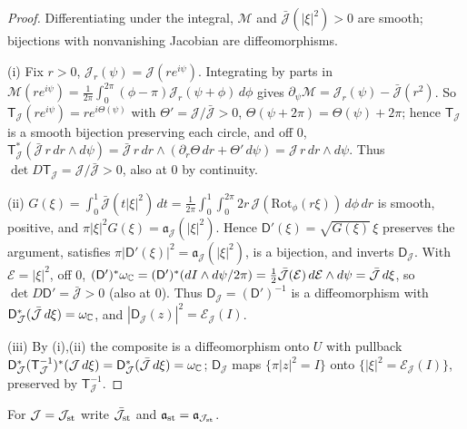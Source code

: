 \begin{proof}
Differentiating under the integral, $\mathcal M$ and $\bar{\mathcal J}(|\xi|^2)>0$ are smooth; bijections with nonvanishing Jacobian are diffeomorphisms.

(i) Fix $r>0$, $\mathcal J_r(\psi)=\mathcal J(re^{i\psi})$. Integrating by parts in $\mathcal M(re^{i\psi})=\frac1{2\pi}\int_0^{2\pi}(\phi-\pi)\mathcal J_r(\psi+\phi)\,d\phi$ gives $\partial_\psi\mathcal M=\mathcal J_r(\psi)-\bar{\mathcal J}(r^2)$. So $\mathsf T_{\mathcal J}(re^{i\psi})=re^{i\Theta(\psi)}$ with $\Theta'=\mathcal J/\bar{\mathcal J}>0$, $\Theta(\psi+2\pi)=\Theta(\psi)+2\pi$; hence $\mathsf T_{\mathcal J}$ is a smooth bijection preserving each circle, and off $0$, $\mathsf T_{\mathcal J}^*(\bar{\mathcal J}\,r\,dr\wedge d\psi)=\bar{\mathcal J}\,r\,dr\wedge(\partial_r\Theta\,dr+\Theta'\,d\psi)=\mathcal J\,r\,dr\wedge d\psi$. Thus $\det D\mathsf T_{\mathcal J}=\mathcal J/\bar{\mathcal J}>0$, also at $0$ by continuity.

(ii) $G(\xi)=\int_0^1\bar{\mathcal J}(t|\xi|^2)\,dt=\frac1{2\pi}\int_0^1\!\int_0^{2\pi}2r\,\mathcal J(\mathrm{Rot}_\phi(r\xi))\,d\phi\,dr$ is smooth, positive, and $\pi|\xi|^2G(\xi)=\mathfrak a_{\mathcal J}(|\xi|^2)$. Hence $\mathsf D'(\xi)=\sqrt{G(\xi)}\,\xi$ preserves the argument, satisfies $\pi|\mathsf D'(\xi)|^2=\mathfrak a_{\mathcal J}(|\xi|^2)$, is a bijection, and inverts $\mathsf D_{\mathcal J}$. With $\mathcal E=|\xi|^2$, off $0$, $(\mathsf D')^*\omega_{\mathbb{C}}=(\mathsf D')^*(dI\wedge d\psi/2\pi)=\tfrac12\bar{\mathcal J}(\mathcal E)\,d\mathcal E\wedge d\psi=\bar{\mathcal J}\,d\xi$, so $\det D\mathsf D'=\bar{\mathcal J}>0$ (also at $0$). Thus $\mathsf D_{\mathcal J}=(\mathsf D')^{-1}$ is a diffeomorphism with $\mathsf D_{\mathcal J}^*(\bar{\mathcal J}\,d\xi)=\omega_{\mathbb{C}}$, and $|\mathsf D_{\mathcal J}(z)|^2=\mathcal E_{\mathcal J}(I)$.

(iii) By (i),(ii) the composite is a diffeomorphism onto $U$ with pullback $\mathsf D_{\mathcal J}^*(\mathsf T_{\mathcal J}^{-1})^*(\mathcal J\,d\xi)=\mathsf D_{\mathcal J}^*(\bar{\mathcal J}\,d\xi)=\omega_{\mathbb{C}}$; $\mathsf D_{\mathcal J}$ maps $\{\pi|z|^2=I\}$ onto $\{|\xi|^2=\mathcal E_{\mathcal J}(I)\}$, preserved by $\mathsf T_{\mathcal J}^{-1}$.
\end{proof}

For $\mathcal J=\mathcal J_{\rm st}$ write $\bar{\mathcal J}_{\rm st}$ and $\mathfrak a_{\rm st}=\mathfrak a_{\mathcal J_{\rm st}}$.

